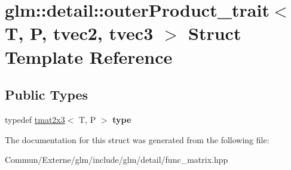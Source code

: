 \hypertarget{structglm_1_1detail_1_1outer_product__trait_3_01_t_00_01_p_00_01tvec2_00_01tvec3_01_4}{}\section{glm\+:\+:detail\+:\+:outer\+Product\+\_\+trait$<$ T, P, tvec2, tvec3 $>$ Struct Template Reference}
\label{structglm_1_1detail_1_1outer_product__trait_3_01_t_00_01_p_00_01tvec2_00_01tvec3_01_4}
\subsection*{Public Types}
\begin{DoxyCompactItemize}
\item 
typedef \hyperlink{structglm_1_1detail_1_1tmat2x3}{tmat2x3}$<$ T, P $>$ {\bfseries type}\hypertarget{structglm_1_1detail_1_1outer_product__trait_3_01_t_00_01_p_00_01tvec2_00_01tvec3_01_4_a960af058d12b8de3d79562804f768d0d}{}\label{structglm_1_1detail_1_1outer_product__trait_3_01_t_00_01_p_00_01tvec2_00_01tvec3_01_4_a960af058d12b8de3d79562804f768d0d}

\end{DoxyCompactItemize}


The documentation for this struct was generated from the following file\+:\begin{DoxyCompactItemize}
\item 
Commun/\+Externe/glm/include/glm/detail/func\+\_\+matrix.\+hpp\end{DoxyCompactItemize}
